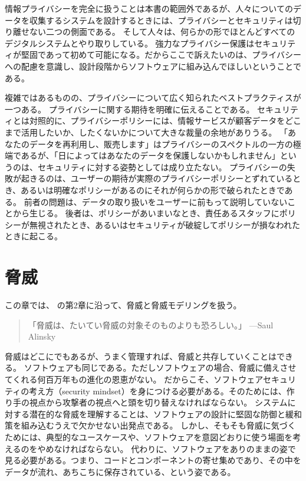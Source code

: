 \documentclass[uplatex]{jsarticle}
\begin{document}
情報プライバシーを完全に扱うことは本書の範囲外であるが、人々についてのデータを収集するシステムを設計するときには、プライバシーとセキュリティは切り離せない二つの側面である。
そして人々は、何らかの形でほとんどすべてのデジタルシステムとやり取りしている。
強力なプライバシー保護はセキュリティが堅固であって初めて可能になる。だからここで訴えたいのは、プライバシーへの配慮を意識し、設計段階からソフトウェアに組み込んでほしいということである。

複雑ではあるものの、プライバシーについて広く知られたベストプラクティスが一つある。
プライバシーに関する期待を明確に伝えることである。
セキュリティとは対照的に、プライバシーポリシーには、情報サービスが顧客データをどこまで活用したいか、したくないかについて大きな裁量の余地がありうる。
「あなたのデータを再利用し、販売します」はプライバシーのスペクトルの一方の極端であるが、「日によってはあなたのデータを保護しないかもしれません」というのは、セキュリティに対する姿勢としては成り立たない。
プライバシーの失敗が起きるのは、ユーザーの期待が実際のプライバシーポリシーとずれているとき、あるいは明確なポリシーがあるのにそれが何らかの形で破られたときである。
前者の問題は、データの取り扱いをユーザーに前もって説明していないことから生じる。
後者は、ポリシーがあいまいなとき、責任あるスタッフにポリシーが無視されたとき、あるいはセキュリティが破綻してポリシーが損なわれたときに起こる。

\newpage

\section{脅威}

この章では、\cite{Kohnfelder2021} の第2章に沿って、脅威と脅威モデリングを扱う。

\begin{quote}
「脅威は、たいてい脅威の対象そのものよりも恐ろしい。」 ---Saul Alinsky
\end{quote}

脅威はどこにでもあるが、うまく管理すれば、脅威と共存していくことはできる。
ソフトウェアも同じである。ただしソフトウェアの場合、脅威に備えさせてくれる何百万年もの進化の恩恵がない。
だからこそ、ソフトウェアセキュリティの考え方（security mindset）を身につける必要がある。そのためには、作り手の視点から攻撃者の視点へと頭を切り替えなければならない。
システムに対する潜在的な脅威を理解することは、ソフトウェアの設計に堅固な防御と緩和策を組み込むうえで欠かせない出発点である。
しかし、そもそも脅威に気づくためには、典型的なユースケースや、ソフトウェアを意図どおりに使う場面を考えるのをやめなければならない。
代わりに、ソフトウェアをありのままの姿で見る必要がある。つまり、コードとコンポーネントの寄せ集めであり、その中をデータが流れ、あちこちに保存されている、という姿である。
\end{document}
